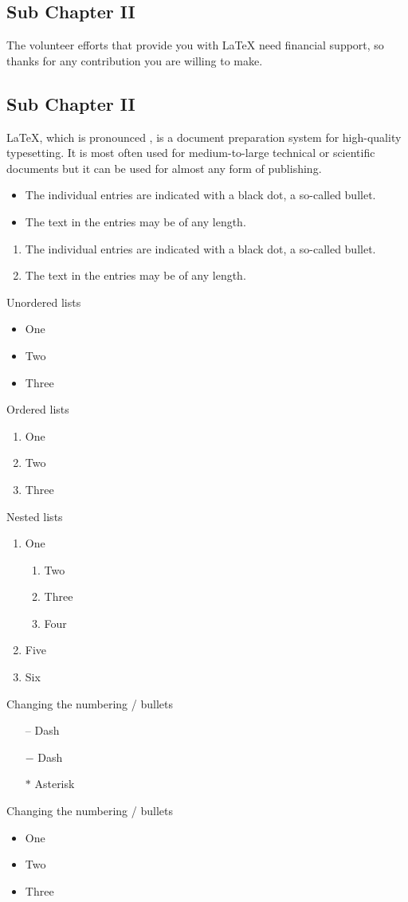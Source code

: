 \documentclass[10pt,a4paper]{article}
\begin{document}
\subsection{Sub Chapter II}
The volunteer efforts that provide you with LaTeX need financial support, so thanks for any contribution you are willing to make.
\subsection{Sub Chapter II}
LaTeX, which is pronounced  , is a document preparation system for high-quality typesetting. It is most often used for medium-to-large technical or scientific documents but it can be used for almost any form of publishing.
\begin{itemize}
  \item The individual entries are indicated with a black dot, a so-called bullet.
  \item The text in the entries may be of any length.
\end{itemize}

\begin{enumerate}
 \item The individual entries are indicated with a black dot, a so-called bullet.
  \item The text in the entries may be of any length.
\end{enumerate}
Unordered lists
\begin{itemize}
	\item One
	\item Two
	\item Three
\end{itemize}


Ordered lists
\begin{enumerate}
	\item One
	\item Two
	\item Three
\end{enumerate}

Nested lists

\begin{enumerate}
	\item One
	\begin{enumerate}
		\item Two
		\item Three
		\item Four
	\end{enumerate}
	\item Five
	\item Six
\end{enumerate}

Changing the numbering / bullets

\begin{itemize}
	\item[--] Dash
	\item[$-$] Dash
	\item[$\ast$] Asterisk
\end{itemize}

Changing the numbering / bullets
\begin{itemize}
	\item One
	\item Two
	\item Three
\end{itemize}
\end{document}
